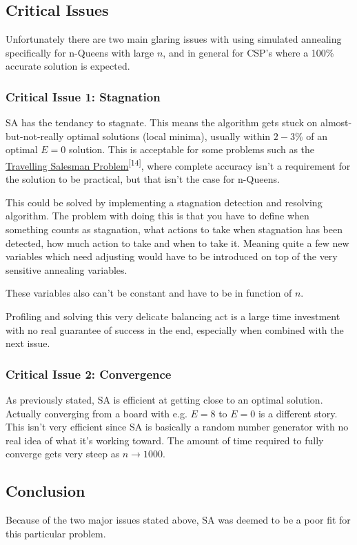 \documentclass{article}
\begin{document}
\subsection{Critical Issues}
Unfortunately there are two main glaring issues with using simulated annealing specifically for n-Queens with large \(n\), and in general for CSP's where a 100\% accurate solution is expected.

\subsubsection{Critical Issue 1: Stagnation}
SA has the tendancy to stagnate. This means the algorithm gets stuck on almost-but-not-really optimal solutions (local minima),
usually within \(2-3\%\) of an optimal \(E = 0\) solution.
This is acceptable for some problems such as the \href{https://en.wikipedia.org/wiki/Travelling_salesman_problem}{Travelling Salesman Problem}\textsuperscript{[14]},
where complete accuracy isn't a requirement for the solution to be practical, but that isn't the case for n-Queens.

This could be solved by implementing a stagnation detection and resolving algorithm.
The problem with doing this is that you have to define when something counts as stagnation,
what actions to take when stagnation has been detected, how much action to take and when to take it.
Meaning quite a few new variables which need adjusting would have to be introduced on top of the very sensitive annealing variables.

These variables also can't be constant and have to be in function of \(n\).

Profiling and solving this very delicate balancing act is a large time investment with no real guarantee of success in the end,
especially when combined with the next issue.

\subsubsection{Critical Issue 2: Convergence}
As previously stated, SA is efficient at getting close to an optimal solution.
Actually converging from a board with e.g. \(E=8\) to \(E=0\) is a different story.
This isn't very efficient since SA is basically a random number generator with no real idea of what it's working toward.
The amount of time required to fully converge gets very steep as \(n \to 1000\).

\subsection{Conclusion}
Because of the two major issues stated above, SA was deemed to be a poor fit for this particular problem.
\end{document}
